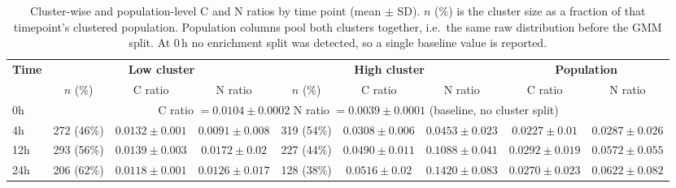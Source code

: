 \begin{table}[h]
\centering
\footnotesize
\renewcommand{\arraystretch}{1.1}
\setlength{\tabcolsep}{6pt}
\caption{Cluster-wise and population-level C and N ratios by time point (mean $\pm$ SD). $n$ (\%) is the cluster size as a fraction of that timepoint's clustered population. Population columns pool both clusters together, i.e.\ the same raw distribution before the GMM split. At 0\,h no enrichment split was detected, so a single baseline value is reported.}
\label{tab:cluster-ratios}
\begin{tabular}{@{}l ccc ccc cc@{}}
\toprule
\multirow{2}{*}{\textbf{Time}} & \multicolumn{3}{c}{\textbf{Low cluster}} & \multicolumn{3}{c}{\textbf{High cluster}} & \multicolumn{2}{c}{\textbf{Population}} \\
\cmidrule(lr){2-4} \cmidrule(lr){5-7} \cmidrule(lr){8-9}
 & $n$ (\%) & C ratio & N ratio & $n$ (\%) & C ratio & N ratio & C ratio & N ratio \\
\midrule
0h & \multicolumn{8}{c}{C ratio $= 0.0104 \pm 0.0002$ \quad N ratio $= 0.0039 \pm 0.0001$ (baseline, no cluster split)} \\
\addlinespace
4h & 272 (46\%) & $0.0132 \pm 0.001$ & $0.0091 \pm 0.008$ & 319 (54\%) & $0.0308 \pm 0.006$ & $0.0453 \pm 0.023$ & $0.0227 \pm 0.01$ & $0.0287 \pm 0.026$ \\
12h & 293 (56\%) & $0.0139 \pm 0.003$ & $0.0172 \pm 0.02$ & 227 (44\%) & $0.0490 \pm 0.011$ & $0.1088 \pm 0.041$ & $0.0292 \pm 0.019$ & $0.0572 \pm 0.055$ \\
24h & 206 (62\%) & $0.0118 \pm 0.001$ & $0.0126 \pm 0.017$ & 128 (38\%) & $0.0516 \pm 0.02$ & $0.1420 \pm 0.083$ & $0.0270 \pm 0.023$ & $0.0622 \pm 0.082$ \\
\bottomrule
\end{tabular}
\end{table}
